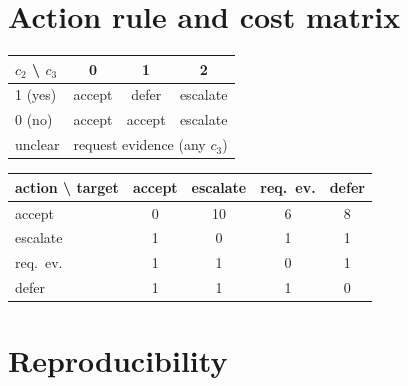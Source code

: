 \section{Action rule and cost matrix}

\begin{apptable}
\centering
\caption{The action rule $F(c_2, c_3)$. \emph{Unclear} is checked first.}
\label{tab:F}

\small
\begin{tabular}{lccc}
\toprule
$c_2$ \textbackslash{} $c_3$ & 0 & 1 & 2 \\
\midrule
1 (yes)    & accept & defer  & escalate \\
0 (no)     & accept & accept & escalate \\
unclear    & \multicolumn{3}{c}{request evidence (any $c_3$)} \\
\bottomrule
\end{tabular}

\end{apptable}

\begin{apptable}
\centering
\caption{Frozen cost matrix $\mathrm{cost}(a, \astar)$. One unit of human
cost is added per escalation. ``req.\ ev.'' = request evidence.}
\label{tab:cost}

\small
\begin{tabular}{lcccc}
\toprule
action \textbackslash{} target & accept & escalate & req.\ ev. & defer \\
\midrule
accept           & 0 & 10 & 6 & 8 \\
escalate         & 1 & 0  & 1 & 1 \\
req.\ ev. & 1 & 1  & 0 & 1 \\
defer            & 1 & 1  & 1 & 0 \\
\bottomrule
\end{tabular}

\end{apptable}

\section{Reproducibility}


